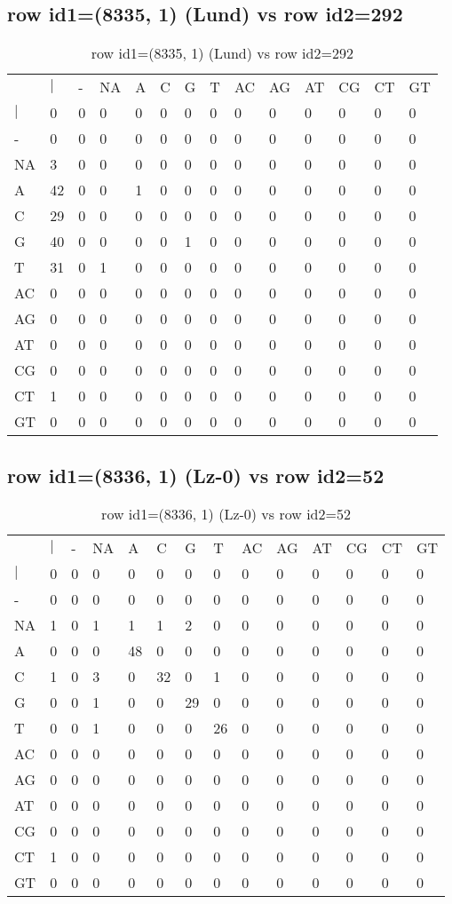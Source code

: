 \subsection{row id1=(8335, 1) (Lund) vs row id2=292}
\begin{center}
\begin{longtable}{|l|l|l|l|l|l|l|l|l|l|l|l|l|l|}
\caption{row id1=(8335, 1) (Lund) vs row id2=292} \label{table_dm336}\\
\hline
\\
\hline
&$|$&-&NA&A&C&G&T&AC&AG&AT&CG&CT&GT\\
$|$&0&0&0&0&0&0&0&0&0&0&0&0&0\\
-&0&0&0&0&0&0&0&0&0&0&0&0&0\\
NA&3&0&0&0&0&0&0&0&0&0&0&0&0\\
A&42&0&0&1&0&0&0&0&0&0&0&0&0\\
C&29&0&0&0&0&0&0&0&0&0&0&0&0\\
G&40&0&0&0&0&1&0&0&0&0&0&0&0\\
T&31&0&1&0&0&0&0&0&0&0&0&0&0\\
AC&0&0&0&0&0&0&0&0&0&0&0&0&0\\
AG&0&0&0&0&0&0&0&0&0&0&0&0&0\\
AT&0&0&0&0&0&0&0&0&0&0&0&0&0\\
CG&0&0&0&0&0&0&0&0&0&0&0&0&0\\
CT&1&0&0&0&0&0&0&0&0&0&0&0&0\\
GT&0&0&0&0&0&0&0&0&0&0&0&0&0\\
\hline
\end{longtable}
\end{center}

\subsection{row id1=(8336, 1) (Lz-0) vs row id2=52}
\begin{center}
\begin{longtable}{|l|l|l|l|l|l|l|l|l|l|l|l|l|l|}
\caption{row id1=(8336, 1) (Lz-0) vs row id2=52} \label{table_dm338}\\
\hline
\\
\hline
&$|$&-&NA&A&C&G&T&AC&AG&AT&CG&CT&GT\\
$|$&0&0&0&0&0&0&0&0&0&0&0&0&0\\
-&0&0&0&0&0&0&0&0&0&0&0&0&0\\
NA&1&0&1&1&1&2&0&0&0&0&0&0&0\\
A&0&0&0&48&0&0&0&0&0&0&0&0&0\\
C&1&0&3&0&32&0&1&0&0&0&0&0&0\\
G&0&0&1&0&0&29&0&0&0&0&0&0&0\\
T&0&0&1&0&0&0&26&0&0&0&0&0&0\\
AC&0&0&0&0&0&0&0&0&0&0&0&0&0\\
AG&0&0&0&0&0&0&0&0&0&0&0&0&0\\
AT&0&0&0&0&0&0&0&0&0&0&0&0&0\\
CG&0&0&0&0&0&0&0&0&0&0&0&0&0\\
CT&1&0&0&0&0&0&0&0&0&0&0&0&0\\
GT&0&0&0&0&0&0&0&0&0&0&0&0&0\\
\hline
\end{longtable}
\end{center}


